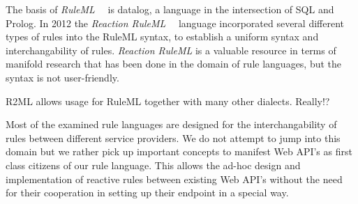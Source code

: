 The basis of \emph{RuleML}~~\cite{2006-Boley-RuleML.pdf} is datalog, a language in the intersection of SQL and Prolog.
In 2012 the \emph{Reaction RuleML}~~\cite{2012-Paschke_etal-ReactionRuleML.pdf} language incorporated several different types of rules into the RuleML syntax, to establish a uniform syntax and interchangability of rules.
\emph{Reaction RuleML} is a valuable resource in terms of manifold research that has been done in the domain of rule languages, but the syntax is not user-friendly.


R2ML allows usage for RuleML together with many other dialects. Really!?


Most of the examined rule languages are designed for the interchangability of rules between different service providers. We do not attempt to jump into this domain but we rather pick up important concepts to manifest Web API's as first class citizens of our rule language. This allows the ad-hoc design and implementation of reactive rules between existing Web API's without the need for their cooperation in setting up their endpoint in a special way.






